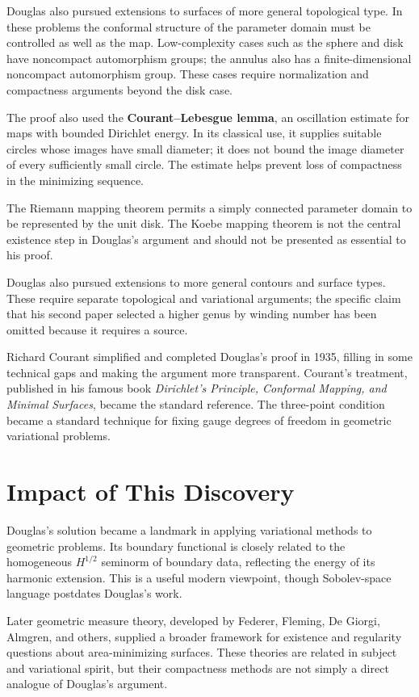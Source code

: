 Douglas also pursued extensions to surfaces of more general topological
type. In these problems the conformal structure of the parameter domain
must be controlled as well as the map. Low-complexity cases such as the
sphere and disk have noncompact automorphism groups; the annulus also
has a finite-dimensional noncompact automorphism group. These cases
require normalization and compactness arguments beyond the disk case.

The proof also used the \textbf{Courant--Lebesgue lemma}, an oscillation
estimate for maps with bounded Dirichlet energy. In its classical use,
it supplies suitable circles whose images have small diameter; it does
not bound the image diameter of every sufficiently small circle. The
estimate helps prevent loss of compactness in the minimizing sequence.

The Riemann mapping theorem permits a simply connected parameter domain
to be represented by the unit disk. The Koebe mapping theorem is not the
central existence step in Douglas's argument and should not be
presented as essential to his proof.

Douglas also pursued extensions to more general contours and surface
types. These require separate topological and variational arguments;
the specific claim that his second paper selected a higher genus by
winding number has been omitted because it requires a source.

Richard Courant \cite{courant} simplified and completed Douglas's proof in 1935,
filling in some technical gaps and making the argument more transparent.
Courant's treatment, published in his famous book
\emph{Dirichlet's Principle, Conformal Mapping, and Minimal Surfaces},
became the standard reference. The three-point condition became a
standard technique for fixing gauge degrees of freedom in geometric
variational problems.

\section{Impact of This Discovery}

Douglas's solution became a landmark in applying variational methods to
geometric problems. Its boundary functional is closely related to the
homogeneous $H^{1/2}$ seminorm of boundary data, reflecting the energy
of its harmonic extension. This is a useful modern viewpoint, though
Sobolev-space language postdates Douglas's work.

Later geometric measure theory, developed by Federer, Fleming, De
Giorgi, Almgren, and others, supplied a broader framework for existence
and regularity questions about area-minimizing surfaces. These theories
are related in subject and variational spirit, but their compactness
methods are not simply a direct analogue of Douglas's argument.

